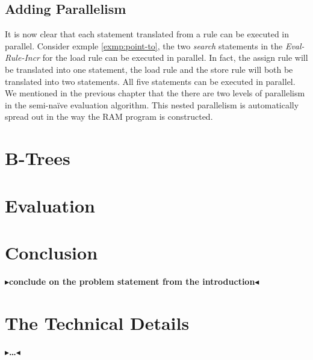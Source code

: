 \documentclass[twoside,11pt,openright]{report}
\theoremstyle{definition}
\newcommand{\todo}[1]{{\color[rgb]{.5,0,0}\textbf{$\blacktriangleright$#1$\blacktriangleleft$}}}
\begin{document}
\section{Adding Parallelism}

It is now clear that each statement translated from a rule can be executed in parallel.
Consider exmple \ref{exmp:point-to}, the two \textit{search} statements in the \textit{Eval-Rule-Incr}
for the load rule can be executed in parallel. In fact, the assign rule will be translated into
one statement, the load rule and the store rule will both be translated into two statements. All
five statements can be executed in parallel. We mentioned in the previous chapter that the
there are two levels of parallelism in the semi-na\"ive evaluation algorithm. This nested
parallelism is automatically spread out in the way the RAM program is constructed.




\chapter{B-Trees}
\label{ch:btrees}



\chapter{Evaluation}
\label{ch:evaluation}


\chapter{Conclusion}
\label{ch:conclusion}

\todo{conclude on the problem statement from the introduction}


\cleardoublepage
{}




\cleardoublepage
\appendix
\chapter{The Technical Details}

\todo{\dots}
\end{document}
